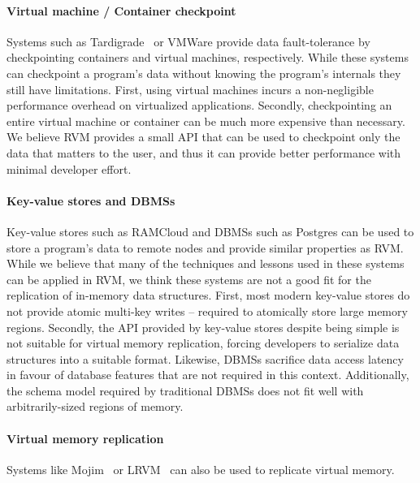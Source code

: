 \paragraph {\bf Virtual machine / Container checkpoint}
Systems such as Tardigrade~\cite{Tardigrade} or VMWare provide data fault-tolerance by checkpointing containers and virtual machines, respectively.
While these systems can checkpoint a program's data without knowing the program's internals they still have limitations. 
First, using virtual machines incurs a non-negligible performance overhead on virtualized applications. Secondly, checkpointing an entire virtual machine or container can be much more expensive
than necessary.
We believe RVM provides a small API that can be used to checkpoint only the data that matters to the user, and thus it can provide better performance with minimal developer effort.

\paragraph {\bf Key-value stores and DBMSs}
Key-value stores such as RAMCloud and DBMSs such as Postgres can be used to store a program's data to remote nodes and provide similar
properties as RVM. While we believe that many of the techniques and lessons used in these systems can be applied in RVM, we think these 
systems are not a good fit for the replication of in-memory data structures.
First, most modern key-value stores do not provide atomic multi-key writes -- required to atomically store large memory regions.
Secondly, the API provided by key-value stores despite being simple is not suitable for virtual memory replication, forcing developers to serialize data structures into a suitable format.
Likewise, DBMSs sacrifice data access latency in favour of database features that are not required in this context. 
Additionally, the schema model required by traditional DBMSs 
does not fit well with arbitrarily-sized regions of memory.


\paragraph {\bf Virtual memory replication}
Systems like Mojim~\cite{Mojim} or LRVM~\cite{LRVM} can also be used to replicate virtual memory.
